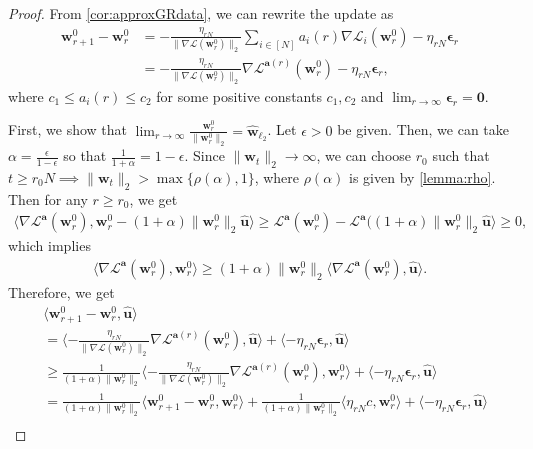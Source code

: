 \documentclass{article} %
\theoremstyle{plain}
\theoremstyle{definition}
\theoremstyle{remark}
\newcommand{\Ls}{\mathcal{L}}
\def\ba{{\boldsymbol a}}
\def\bu{{\mathbf u}}
\def\bw{{\mathbf w}}
\begin{document}
\GRdata*
\begin{proof}
    From \cref{cor:approxGRdata}, we can rewrite the update as
    \begin{align*}
        \bw_{r+1}^0-\bw_r^0&=-\frac{\eta_{rN}}{\|\nabla\Ls(\bw_r^0)\|_2} \sum_{i \in [N]}a_i(r)\nabla\Ls_i(\bw_r^0) - \eta_{rN}\boldsymbol{\epsilon}_r \\
        &= -\frac{\eta_{rN}}{\|\nabla\Ls(\bw_r^0)\|_2} \nabla \Ls^{\ba(r)}(\bw_r^0) - \eta_{rN} \boldsymbol{\epsilon}_r,
    \end{align*}
    where $c_1\leq a_i(r) \leq c_2$ for some positive constants $c_1, c_2$ and $\lim_{r\rightarrow\infty}\boldsymbol{\epsilon}_r=\mathbf{0}$.

    First, we show that $\lim_{r\rightarrow\infty}\frac{\bw_r^0}{\|\bw_r^0\|_2} = \hat{\bw}_{\ell_2}$. Let $\epsilon>0$ be given. Then, we can take $\alpha=\frac{\epsilon}{1-\epsilon}$ so that $\frac{1}{1+\alpha}=1-\epsilon$. Since $\|\bw_t\|_2\rightarrow\infty$, we can choose $r_0$ such that $t\geq r_0N \implies \|\bw_t\|_2 > \max\{\rho(\alpha), 1\}$, where $\rho(\alpha)$ is given by \cref{lemma:rho}. Then for any $r \geq r_0$, we get
    \begin{align*}
        \langle \nabla \Ls^\ba(\bw_r^0),\bw_r^0-(1+\alpha)\|\bw_r^0\|_2\hat{\bu} \rangle \geq \Ls^\ba(\bw_r^0) - \Ls^\ba((1+\alpha)\|\bw_r^0\|_2 \hat{\bu} \rangle \geq 0,
    \end{align*}
    which implies
    \begin{align*}
        \langle \nabla \Ls^\ba(\bw_r^0), \bw_r^0 \rangle \geq (1+\alpha)\|\bw_r^0\|_2 \langle \nabla \Ls^\ba(\bw_r^0), \hat{\bu} \rangle.
    \end{align*}
    Therefore, we get
    \begin{align*}
        &\langle \bw_{r+1}^0-\bw_r^0, \hat{\bu} \rangle \\
        &= \langle -\frac{\eta_{rN}}{\|\nabla\Ls(\bw_r^0)\|_2}\nabla\Ls^{\ba(r)}(\bw_r^0), \hat{\bu} \rangle + \langle -\eta_{rN}\boldsymbol{\epsilon}_r,\hat{\bu} \rangle \\
        &\geq \frac{1}{(1+\alpha)\|\bw_r^0\|_2}\langle -\frac{\eta_{rN}}{\|\nabla\Ls(\bw_r^0)\|_2}\nabla\Ls^{\ba(r)}(\bw_r^0), \bw_r^0 \rangle + \langle -\eta_{rN}\boldsymbol{\epsilon}_r,\hat{\bu} \rangle \\
        &=\frac{1}{(1+\alpha)\|\bw_r^0\|_2}\langle \bw_{r+1}^0-\bw_r^0, \bw_r^0 \rangle+\frac{1}{(1+\alpha)\|\bw_r^0\|_2}\langle \eta_{rN} c, \bw_r^0 \rangle + \langle -\eta_{rN}\boldsymbol{\epsilon}_r,\hat{\bu} \rangle \\

\end{align*}
\end{proof}
\end{document}
